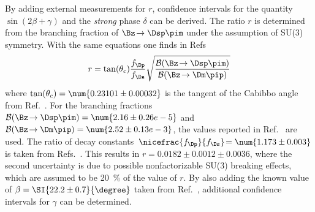 By adding external measurements for $r$, confidence intervals for the quantity $\sin\!\left(2\beta+\gamma\right)$ and the \emph{strong} phase $\delta$ can be derived.
The ratio $r$ is determined from the branching fraction of $\Bz\!\to\Dsp\pim$ under the assumption of SU(3) symmetry.
With the same equations one finds in Refs~\cite{Aubert:2008zi, Das:2010be}
\begin{equation}
r=\tan(\theta_c)\frac{f_\Dp}{f_\Ds}\sqrt{\frac{\mathcal{B}\!\left(\Bz\!\to\Dsp\pim\right)}{\mathcal{B}\!\left(\Bz\!\to\Dm\pip\right)}}
\end{equation}
where $\tan(\theta_c)=\num{0.23101\pm0.00032}$ is the tangent of the Cabibbo angle from Ref.~\cite{CKMfitter2015}.
For the branching fractions \mbox{$\mathcal{B}\!\left(\Bz\!\to\Dsp\pim\right)=\num{2.16\pm0.26 e-5}$} and \mbox{$\mathcal{B}\!\left(\Bz\!\to\Dm\pip\right)=\num{2.52\pm0.13 e-3}$}, the values reported in Ref.~\cite{PDG2018} are used.
The ratio of decay constants $\,\nicefrac{f_\Dp}{f_\Ds}\!=\num{1.173\pm0.003}$ is taken from \mbox{Refs.~\cite{Aoki:2016frl, Bazavov:2014wgs, Carrasco:2014poa}}.
This results in $r=0.0182\pm0.0012\pm0.0036$, where the second uncertainty is due to possible nonfactorizable SU(3) breaking effects, which are assumed to be \SI{20}{\percent} of the value of $r$.
By also adding the known value of $\beta=\SI{22.2\pm0.7}{\degree}$ taken from Ref.~\cite{HFLAV2016}, additional confidence intervals for $\gamma$ can be determined.

